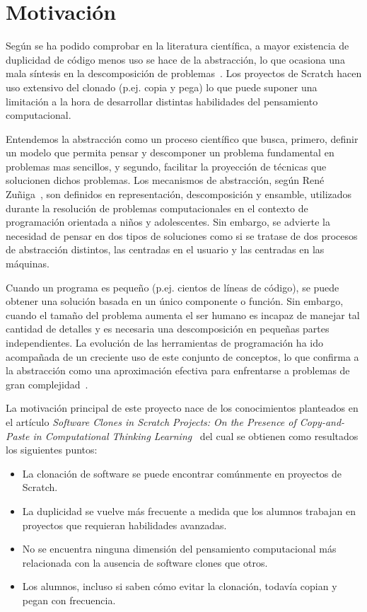 \documentclass[a4paper, 12pt]{book}
\begin{document}
\section{Motivación}
\label{sec:motivacion}

Según se ha podido comprobar en la literatura científica, a mayor existencia de duplicidad de código menos uso se hace de la abstracción, lo que ocasiona una mala síntesis en la descomposición de problemas~\cite{baxter_yahin}. Los proyectos de Scratch hacen uso extensivo del clonado (p.ej. copia y pega) lo que puede suponer una limitación a la hora de desarrollar distintas habilidades del pensamiento computacional.

Entendemos la abstracción como un proceso científico que busca, primero, definir un modelo que permita pensar y descomponer un problema fundamental en problemas mas sencillos, y segundo, facilitar la proyección de técnicas que solucionen dichos problemas. Los mecanismos de abstracción, según René Zuñiga~\cite{munoz2014abstraccion}, son definidos en representación, descomposición y ensamble, utilizados durante la resolución de problemas computacionales en el contexto de programación orientada a niños y adolescentes. Sin embargo, se advierte la necesidad de pensar en dos tipos de soluciones como si se tratase de dos procesos de abstracción distintos, las centradas en el usuario y las centradas en las máquinas.

Cuando un programa es peque\~{n}o (p.ej. cientos de líneas de código), se puede obtener una solución basada en un único componente o función. Sin embargo, cuando el tama\~{n}o del problema aumenta el ser humano es incapaz de manejar tal cantidad de detalles y es necesaria una descomposición en peque\~{n}as partes independientes. La evolución de las herramientas de programación ha ido acompañada de un creciente uso de este conjunto de conceptos, lo que confirma a la abstracción como una aproximación efectiva para enfrentarse a problemas de gran complejidad~\cite{garridoabstraccion}.

La motivación principal de este proyecto nace de los conocimientos planteados en el artículo \emph{Software Clones in Scratch Projects: On the Presence of Copy-and-Paste in Computational Thinking Learning}~\cite{robles2017software} del cual se obtienen como resultados los siguientes puntos:

\begin{itemize}
 \item La clonación de software se puede encontrar comúnmente en proyectos de Scratch.
 \item La duplicidad se vuelve más frecuente a medida que los alumnos trabajan en proyectos que requieran habilidades avanzadas.
 \item No se encuentra ninguna dimensión del pensamiento computacional más relacionada con la ausencia de software clones que otros.
 \item Los alumnos, incluso si saben cómo evitar la clonación, todavía copian y pegan con frecuencia.
 \end{itemize}
\end{document}
